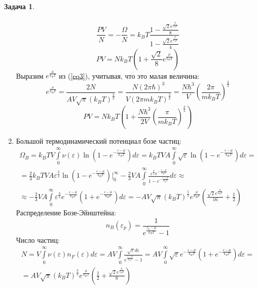 \documentclass[12pt]{article}
\theoremstyle{definition}
\newtheorem{zad}{Задача}[section]
\begin{document}
\begin{zad}
\begin{enumerate}
\begin{multline}
\end{multline}
\begin{equation}
    \frac{PV}{N}=-\frac{\Omega}{N}=k_BT\frac{1-\frac{\sqrt{2}e^\frac{\mu}{k_BT}}{8}}{1-\frac{\sqrt{2}e^\frac{\mu}{k_BT}}{4}}
\end{equation}
\begin{equation}
    PV=Nk_BT\left(1+\frac{\sqrt{2}}{8}e^\frac{\mu}{k_BT}\right)
\end{equation}
Выразим $e^\frac{\mu}{k_BT}$ из (\ref{eq3}), учитывая, что это малая величина:
\begin{equation}
    e^\frac{\mu}{k_BT}=\frac{2N}{AV\sqrt{\pi}(k_BT)^\frac{3}{2}}=\frac{N(2\pi\hbar)^3}{V(2\pi mk_BT)^\frac{3}{2}}=\frac{N\hbar^3}{V}\left(\frac{2\pi}{mk_BT}\right)^\frac{3}{2}
\end{equation}
\begin{equation}
    \boxed{PV=Nk_BT\left(1+\frac{N\hbar^3}{2V}\left(\frac{\pi}{mk_BT}\right)^\frac{3}{2}\right)}
\end{equation}
\item Большой термодинамический потенциал бозе частиц:
    \begin{multline}
        \Omega_B=k_BTV\int\limits_0^\infty\nu(\varepsilon)\ln\left(1-e^{-\frac{\varepsilon-\mu}{k_BT}}\right)d\varepsilon=k_BTVA\int\limits_0^\infty\sqrt{\varepsilon}\ln\left(1-e^{-\frac{\varepsilon-\mu}{k_BT}}\right)d\varepsilon=\\=\frac{2}{3}k_BTVA\varepsilon^\frac{3}{2}\ln\left(1-e^{-\frac{\varepsilon-\mu}{k_BT}}\right)\bigg|_0^\infty-\frac{2}{3}VA\int\limits_0^\infty\frac{\varepsilon^\frac{3}{2}e^{-\frac{\varepsilon-\mu}{k_BT}}}{1-e^{-\frac{\varepsilon-\mu}{k_BT}}}d\varepsilon\approx\\\approx-\frac{2}{3}VA\int\limits_0^\infty\varepsilon^\frac{3}{2}e^{-\frac{\varepsilon-\mu}{k_BT}}(1+e^{-\frac{\varepsilon-\mu}{k_BT}})d\varepsilon=-AV\sqrt{\pi}(k_BT)^\frac{5}{2}e^\frac{\mu}{k_BT}\left(\frac{\sqrt{2}e^\frac{\mu}{k_BT}}{16}+\frac{1}{2}\right)
    \end{multline}
    Распределение Бозе-Эйнштейна:
    \begin{equation}
        n_B(\varepsilon_p)=\frac{1}{e^{\frac{\varepsilon_p-\mu}{k_BT}}-1}
    \end{equation}
    Число частиц:
\begin{multline}\label{eq4}
    N=V\int\limits_0^\infty\nu(\varepsilon)n_F(\varepsilon)d\varepsilon=AV\int\limits_0^\infty\frac{\sqrt{\varepsilon}d\varepsilon}{e^\frac{\varepsilon-\mu}{k_BT}-1}=AV\int\limits_0^\infty\sqrt{\varepsilon}e^{-\frac{\varepsilon-\mu}{k_BT}}(1+e^{-\frac{\varepsilon-\mu}{k_BT}})d\varepsilon=\\=AV\sqrt{\pi}(k_BT)^\frac{3}{2}e^{\frac{\mu}{k_BT}}\left(\frac{1}{2}+\frac{\sqrt{2}e^{\frac{\mu}{k_BT}}}{8}\right)

\end{multline}
\end{enumerate}
\end{zad}
\end{document}
